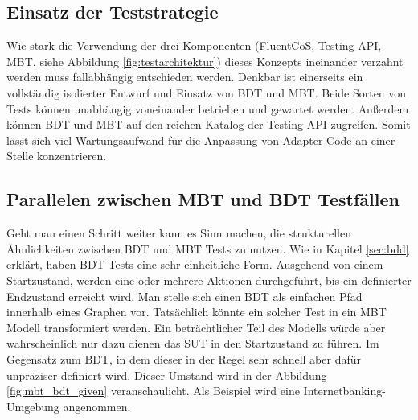 \subsection{Einsatz der Teststrategie}
Wie stark die Verwendung der drei Komponenten (FluentCoS, Testing API, MBT, siehe Abbildung \ref{fig:testarchitektur}) dieses Konzepts ineinander verzahnt werden muss fallabhängig entschieden werden. Denkbar ist einerseits ein vollständig isolierter Entwurf und Einsatz von \Gls{BDT} und \Gls{MBT}. Beide Sorten von Tests können unabhängig voneinander betrieben und gewartet werden. Außerdem können \Gls{BDT} und \Gls{MBT} auf den reichen Katalog der Testing API zugreifen. Somit lässt sich viel Wartungsaufwand für die Anpassung von Adapter-Code an einer Stelle konzentrieren.

\subsection{Parallelen zwischen MBT und BDT Testfällen}
\label{sec:mbt_bdt_parallelen}

Geht man einen Schritt weiter kann es Sinn machen, die strukturellen Ähnlichkeiten zwischen \Gls{BDT} und \Gls{MBT} Tests zu nutzen. Wie in Kapitel \ref{sec:bdd} erklärt, haben \Gls{BDT} Tests eine sehr einheitliche Form. Ausgehend von einem Startzustand, werden eine oder mehrere Aktionen durchgeführt, bis ein definierter Endzustand erreicht wird. Man stelle sich einen \Gls{BDT} als einfachen Pfad innerhalb eines Graphen vor. Tatsächlich könnte ein solcher Test in ein \Gls{MBT} Modell transformiert werden. Ein beträchtlicher Teil des Modells würde aber wahrscheinlich nur dazu dienen das \Gls{SUT} in den Startzustand zu führen. Im Gegensatz zum \Gls{BDT}, in dem dieser in der Regel sehr schnell aber dafür unpräziser definiert wird. Dieser Umstand wird in der Abbildung \ref{fig:mbt_bdt_given} veranschaulicht. Als Beispiel wird eine Internetbanking-Umgebung angenommen.

